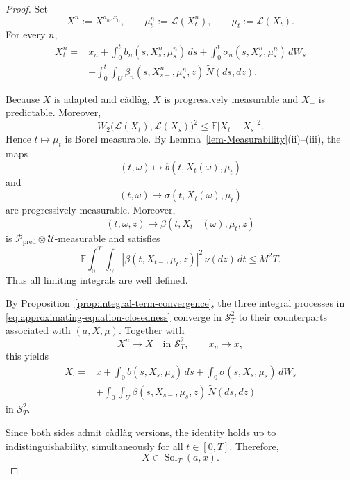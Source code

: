 \documentclass[12pt,oneside, reqno]{amsart}
\numberwithin{equation}{section}
\begin{document}
	\begin{proof}
		Set
		\[
		X^n:=X^{a_n,x_n},
		\qquad
		\mu_t^n:=\mathcal L(X_t^n),
		\qquad
		\mu_t:=\mathcal L(X_t).
		\]
		For every $n$,
		\begin{align}
			X_t^n
			={}&
			x_n
			+
			\int_0^t b_n(s,X_s^n,\mu_s^n)\,ds
			+
			\int_0^t\sigma_n(s,X_s^n,\mu_s^n)\,dW_s
			\nonumber\\
			&+
			\int_0^t\int_U
			\beta_n(s,X_{s-}^n,\mu_s^n,z)\,
			\widetilde N(ds,dz).
			\label{eq:approximating-equation-closedness}
		\end{align}
		
		
		Because $X$ is adapted and c\`adl\`ag, $X$ is progressively
		measurable and $X_{-}$ is predictable. Moreover,
		\[
		W_2\bigl(\mathcal L(X_t),\mathcal L(X_s)\bigr)^2
		\leq
		\mathbb E|X_t-X_s|^2.
		\]
		Hence $t\mapsto\mu_t$ is Borel measurable.	By Lemma~\ref{lem-Measurability}\textnormal{(ii)--(iii)}, the maps
		\[
		(t,\omega)
		\longmapsto
		b(t,X_t(\omega),\mu_t)
		\]
		and
		\[
		(t,\omega)
		\longmapsto
		\sigma(t,X_t(\omega),\mu_t)
		\]
		are progressively measurable. Moreover,
		\[
		(t,\omega,z)
		\longmapsto
		\beta(t,X_{t-}(\omega),\mu_t,z)
		\]
		is
		\(\mathcal P_{\mathrm{pred}}\otimes\mathcal U\)-measurable and
		satisfies
		\[
		\mathbb E\int_0^T\int_U
		|\beta(t,X_{t-},\mu_t,z)|^2\,\nu(dz)\,dt
		\leq M^2T.
		\]
		Thus all limiting integrals are well defined.
		
		
		
		By Proposition~\ref{prop:integral-term-convergence}, the three
		integral processes in
		\eqref{eq:approximating-equation-closedness} converge in
		$\mathcal S_T^2$ to their counterparts associated with
		$(a,X,\mu)$. Together with
		\[
		X^n\longrightarrow X
		\quad\text{in }\mathcal S_T^2,
		\qquad
		x_n\longrightarrow x,
		\]
		this yields
		\begin{equation}
			\label{eq:limit-equation-S2}
			\begin{aligned}
				X_\cdot
				={}&
				x
				+\int_0^\cdot b(s,X_s,\mu_s)\,ds
				+\int_0^\cdot\sigma(s,X_s,\mu_s)\,dW_s
				\\
				&+
				\int_0^\cdot\int_U
				\beta(s,X_{s-},\mu_s,z)\,
				\widetilde N(ds,dz)
			\end{aligned}
		\end{equation}
		in $\mathcal S_T^2$.
		
		Since both sides admit c\`adl\`ag versions, the identity holds up to
		indistinguishability, simultaneously for all $t\in[0,T]$. Therefore,
		\[
		X\in\operatorname{Sol}_T(a,x).
		\]
	\end{proof}
	
\end{document}
